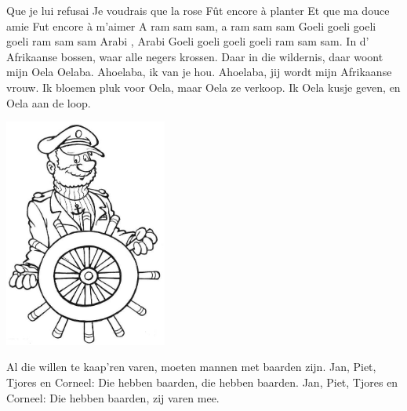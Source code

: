 \documentclass{article}
\begin{document}
\begin{songs}{}
Que je lui refusai
\endverse
\beginverse
Je voudrais que la rose
Fût encore à planter
Et que ma douce amie
Fut encore à m'aimer
\endverse
\endsong
{}
\beginverse*
A ram sam sam, a ram sam sam
Goeli goeli goeli goeli
ram sam sam
Arabi , Arabi
Goeli goeli goeli goeli
ram sam sam.
\endverse
\endsong
{}
\beginverse
In d' Afrikaanse bossen, waar alle negers krossen.
Daar in die wildernis, daar woont mijn Oela Oelaba.
\endverse
\beginchorus
Ahoelaba, ik van je hou.
Ahoelaba, jij wordt mijn Afrikaanse vrouw.
\endchorus
\beginverse
Ik bloemen pluk voor Oela, maar Oela ze verkoop.
Ik Oela kusje geven, en Oela aan de loop.
\endverse
\endsong
\begin{intersong}
    \includegraphics[width=0.4\textwidth]{img2}
\end{intersong}
\beginverse*
Al die willen te kaap'ren  varen, moeten mannen met baarden zijn.
Jan, Piet, Tjores en Corneel: Die hebben baarden, die hebben baarden.
Jan, Piet, Tjores en Corneel: Die hebben baarden, zij varen mee.
\endverse
\endsong


\end{songs}
\end{document}
